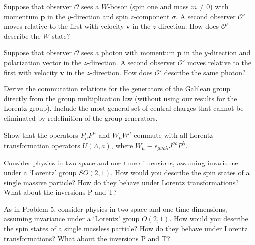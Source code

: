 
\begin{enumerate}
 Suppose that observer $\mathcal{O}$ sees a $W$-boson (spin one and mass
  $m\neq0$) with momentum $\mathbf{p}$ in the $y$-direction and spin
  $z$-component $\sigma$. A second observer $\mathcal{O}'$ moves relative to
  the first with velocity $\mathbf{v}$ in the $z$-direction. How does
  $\mathcal{O}'$ describe the $W$ state?

 Suppose that observer $\mathcal{O}$ sees a photon with momentum
  $\mathbf{p}$ in the $y$-direction and polarization vector in the
  $z$-direction. A second observer $\mathcal{O}'$ moves relative to the first
  with velocity $\mathbf{v}$ in the $z$-direction. How does $\mathcal{O}'$
  describe the same photon?

 Derive the commutation relations for the generators of the Galilean
  group directly from the group multiplication law (without using our
  results for the Lorentz group). Include the most general set of central
  charges that cannot be eliminated by redefinition of the group generators.

 Show that the operators $P_\mu P^\mu$ and $W_\mu W^\mu$ commute with all
  Lorentz transformation operators $U(\Lambda,a)$, where
  $W_\mu\equiv\epsilon_{\mu\nu\rho\lambda}J^{\nu\rho}P^\lambda$.

 Consider physics in two space and one time dimensions, assuming
  invariance under a `Lorentz' group $SO(2,1)$. How would you describe the
  spin states of a single massive particle? How do they behave under Lorentz
  transformations? What about the inversions P and T?

 As in Problem 5, consider physics in two space and one time dimensions,
  assuming invariance under a `Lorentz' group $O(2,1)$. How would you describe
  the spin states of a single massless particle? How do they behave under
  Lorentz transformations? What about the inversions P and T?
\end{enumerate}
